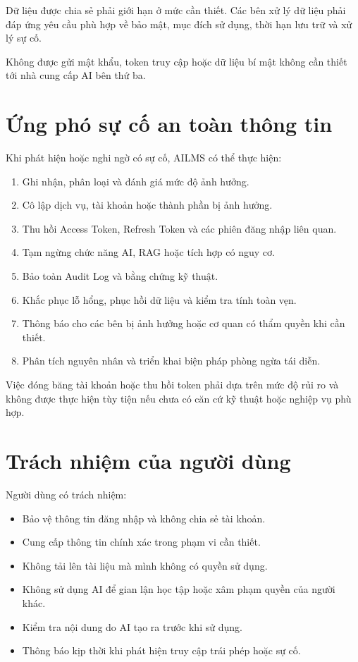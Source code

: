 \documentclass[12pt,a4paper]{article}
\begin{document}
Dữ liệu được chia sẻ phải giới hạn ở mức cần thiết. Các bên xử lý dữ liệu phải đáp ứng
yêu cầu phù hợp về bảo mật, mục đích sử dụng, thời hạn lưu trữ và xử lý sự cố.

Không được gửi mật khẩu, token truy cập hoặc dữ liệu bí mật không cần thiết
tới nhà cung cấp AI bên thứ ba.

\section{Ứng phó sự cố an toàn thông tin}

Khi phát hiện hoặc nghi ngờ có sự cố, AILMS có thể thực hiện:

\begin{enumerate}
    \item Ghi nhận, phân loại và đánh giá mức độ ảnh hưởng.
    \item Cô lập dịch vụ, tài khoản hoặc thành phần bị ảnh hưởng.
    \item Thu hồi Access Token, Refresh Token và các phiên đăng nhập liên quan.
    \item Tạm ngừng chức năng AI, RAG hoặc tích hợp có nguy cơ.
    \item Bảo toàn Audit Log và bằng chứng kỹ thuật.
    \item Khắc phục lỗ hổng, phục hồi dữ liệu và kiểm tra tính toàn vẹn.
    \item Thông báo cho các bên bị ảnh hưởng hoặc cơ quan có thẩm quyền khi cần thiết.
    \item Phân tích nguyên nhân và triển khai biện pháp phòng ngừa tái diễn.
\end{enumerate}

Việc đóng băng tài khoản hoặc thu hồi token phải dựa trên mức độ rủi ro và
không được thực hiện tùy tiện nếu chưa có căn cứ kỹ thuật hoặc nghiệp vụ phù hợp.

\section{Trách nhiệm của người dùng}

Người dùng có trách nhiệm:

\begin{itemize}
    \item Bảo vệ thông tin đăng nhập và không chia sẻ tài khoản.
    \item Cung cấp thông tin chính xác trong phạm vi cần thiết.
    \item Không tải lên tài liệu mà mình không có quyền sử dụng.
    \item Không sử dụng AI để gian lận học tập hoặc xâm phạm quyền của người khác.
    \item Kiểm tra nội dung do AI tạo ra trước khi sử dụng.
    \item Thông báo kịp thời khi phát hiện truy cập trái phép hoặc sự cố.
\end{itemize}
\end{document}
